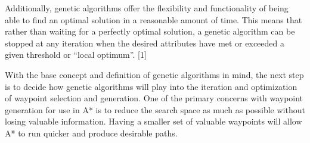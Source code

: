 	Additionally, genetic algorithms offer the flexibility and functionality of being able to find an optimal solution in a reasonable amount of time. This means that rather than waiting for a perfectly optimal solution, a genetic algorithm can be stopped at any iteration when the desired attributes have met or exceeded a given threshold or “local optimum”. [1]
	
	With the base concept and definition of genetic algorithms in mind, the next step is to decide how genetic algorithms will play into the iteration and optimization of waypoint selection and generation. One of the primary concerns with waypoint generation for use in A* is to reduce the search space as much as possible without losing valuable information. Having a smaller set of valuable waypoints will allow A* to run quicker and produce desirable paths.
	